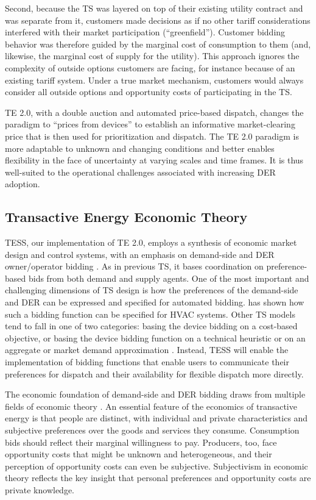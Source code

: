 \documentclass[12pt]{article}{Definitions/mdpi}
\begin{document}
Second, because the TS was layered on top of their existing utility contract and was separate from it, customers made decisions as if no other tariff considerations interfered with their market participation (``greenfield''). Customer bidding behavior was therefore guided by the marginal cost of consumption to them (and, likewise, the marginal cost of supply for the utility). This approach ignores the complexity of outside options customers are facing, for instance because of an existing tariff system. Under a true market mechanism, customers would always consider all outside options and opportunity costs of participating in the TS.

TE 2.0, with a double auction and automated price-based dispatch, changes the paradigm to ``prices from devices'' to establish an informative market-clearing price that is then used for prioritization and dispatch. The TE 2.0 paradigm is more adaptable to unknown and changing conditions and better enables flexibility in the face of uncertainty at varying scales and time frames. It is thus well-suited to the operational challenges associated with increasing DER adoption.

\subsection{Transactive Energy Economic Theory}\label{sec:teecon}

TESS, our implementation of TE 2.0, employs a synthesis of economic market design and control systems, with an emphasis on demand-side and DER owner/operator bidding \citep{chassin2017thesis}. 
As in previous TS, it bases coordination on preference-based bids from both demand and supply agents. 
One of the most important and challenging dimensions of TS design is how the preferences of the demand-side and DER can be expressed and specified for automated bidding. 
\citet[Chapter IV]{Arlt2020} has shown how such a bidding function can be specified for HVAC systems.
Other TS models tend to fall in one of two categories: basing the device bidding on a cost-based objective, or basing the device bidding function on a technical heuristic or on an aggregate or market demand approximation \citep[Chapter IV]{Arlt2020}. Instead, TESS will enable the implementation of bidding functions that enable users to communicate their preferences for dispatch and their availability for flexible dispatch more directly.

The economic foundation of demand-side and DER bidding draws from multiple fields of economic theory \citep{kiesling_2021}. An essential feature of the economics of transactive energy is that people are distinct, with individual and private characteristics and subjective preferences over the goods and services they consume. Consumption bids should reflect their marginal willingness to pay. Producers, too, face opportunity costs that might be unknown and heterogeneous, and their perception of opportunity costs can even be subjective. Subjectivism in economic theory reflects the key insight that personal preferences and opportunity costs are private knowledge.
\end{document}
